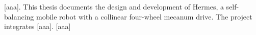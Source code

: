 [aaa]. This thesis documents the design and development of Hermes, a self-balancing mobile robot with a collinear four-wheel mecanum drive. The project integrates [aaa]. [aaa]